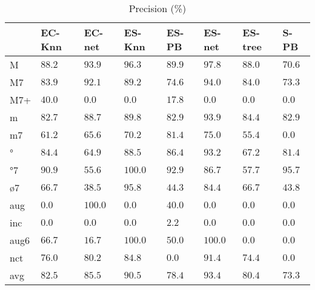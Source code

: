 \documentclass{article}
\begin{document}
\begin{table}
  \centering
\begin{tabular}{l|p{0.5cm}p{0.5cm}p{0.5cm}p{0.5cm}p{0.5cm}p{0.5cm}p{0.5cm}}
       &      EC-Knn &      EC-net &      ES-Knn &       ES-PB &      ES-net &     ES-tree &        S-PB  \\ \hline
   M & $     88.2$ & $     93.9$ & $     96.3$ & $     89.9$ & $     97.8$ & $     88.0$ & $     70.6$  \\
  M7 & $     83.9$ & $     92.1$ & $     89.2$ & $     74.6$ & $     94.0$ & $     84.0$ & $     73.3$  \\
 M7+ & $     40.0$ & $      0.0$ & $      0.0$ & $     17.8$ & $      0.0$ & $      0.0$ & $      0.0$  \\
   m & $     82.7$ & $     88.7$ & $     89.8$ & $     82.9$ & $     93.9$ & $     84.4$ & $     82.9$  \\
  m7 & $     61.2$ & $     65.6$ & $     70.2$ & $     81.4$ & $     75.0$ & $     55.4$ & $      0.0$  \\
  ° & $     84.4$ & $     64.9$ & $     88.5$ & $     86.4$ & $     93.2$ & $     67.2$ & $     81.4$  \\
 °7 & $     90.9$ & $     55.6$ & $    100.0$ & $     92.9$ & $     86.7$ & $     57.7$ & $     95.7$  \\
 ø7 & $     66.7$ & $     38.5$ & $     95.8$ & $     44.3$ & $     84.4$ & $     66.7$ & $     43.8$  \\
 aug & $      0.0$ & $    100.0$ & $      0.0$ & $     40.0$ & $      0.0$ & $      0.0$ & $      0.0$  \\
 inc & $      0.0$ & $      0.0$ & $      0.0$ & $      2.2$ & $      0.0$ & $      0.0$ & $      0.0$  \\
aug6 & $     66.7$ & $     16.7$ & $    100.0$ & $     50.0$ & $    100.0$ & $      0.0$ & $      0.0$  \\
 nct & $     76.0$ & $     80.2$ & $     84.8$ & $      0.0$ & $     91.4$ & $     74.4$ & $      0.0$  \\
\hline
 avg & $     82.5$ & $     85.5$ & $     90.5$ & $     78.4$ & $     93.4$ & $     80.4$ & $     73.3$  \\
\end{tabular}


  \caption{Precision (\%)}
  \label{tab:precision}
\end{table}
\end{document}
